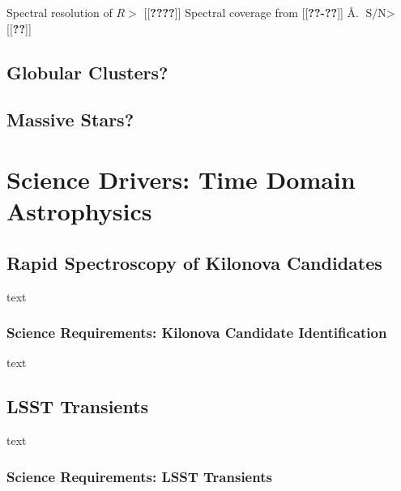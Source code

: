 \documentclass[11pt,a4paper,twoside,onecolumn,openany,final,oldfontcommands]{memoir}
\newcommand{\edit}[2][todo]{{\color{#1}[[{\bf #2}]]}}
\begin{document}
\begin{requirement}
\reqitem Spectral resolution of $R>$ \edit{????}
\reqitem Spectral coverage from \edit{??-??} \AA.
\reqitem $\text{S/N}>$ \edit{??}

\end{requirement}

\section{Globular Clusters?}

\section{Massive Stars?}

\newpage


\newpage

\chapter{Science Drivers: Time Domain Astrophysics} \label{sci:timedomain}

\section{Rapid Spectroscopy of Kilonova Candidates}

text

\subsection{Science Requirements: Kilonova Candidate Identification}

\begin{sciencerequirement}

\reqitem text
\end{sciencerequirement}

\section{LSST Transients}

text

\subsection{Science Requirements: LSST Transients}
\end{document}
